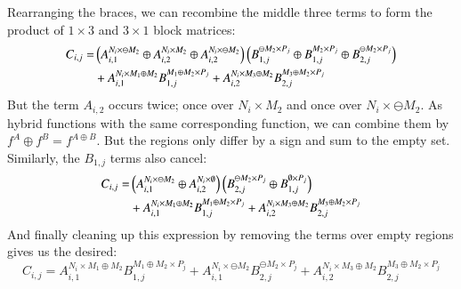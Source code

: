 Rearranging the braces, we can recombine the middle three terms to form the product of $1 \times 3$ and $3 \times 1$ block matrices:
\begin{align*}
	C_{i,j} 	=& \left( A_{i,1}^{N_i \times \ominus M_2} 
				\oplus  A_{i,2}^{N_i \times M_2} 
				\oplus A_{i,2}^{N_i \times \ominus M_2} \right)
			\left( B_{1,j}^{\ominus M_2 \times P_j} 
				\oplus B_{1,j}^{M_2 \times P_j} 
				\oplus B_{2,j}^{\ominus M_2 \times P_j} \right)\notag\\
			&+ A_{i,1}^{N_i \times M_1 \oplus M_2} B_{1,j}^{M_1 \oplus M_2 \times P_j} 
			+ A_{i,2}^{N_i \times M_3 \oplus M_2} B_{2,j}^{M_3 \oplus M_2 \times P_j} 
\end{align*}
But the term $A_{i,2}$ occurs twice; once over $N_i \times M_2$ and once over $N_i \times \ominus M_2$.
As hybrid functions with the same corresponding function, we can combine them by $f^A \oplus f^B = f^{A\oplus B}$.
But the regions only differ by a sign and sum to the empty set.
Similarly, the $B_{1,j}$ terms also cancel:
\begin{align*}
	C_{i,j} 	=& \left( A_{i,1}^{N_i \times \ominus M_2} \oplus  A_{i,2}^{N_i \times \emptyset}  \right)
			\left(  B_{2,j}^{\ominus M_2 \times P_j} \oplus B_{1,j}^{\emptyset \times P_j} \right)\notag\\
			&+ A_{i,1}^{N_i \times M_1 \oplus M_2} B_{1,j}^{M_1 \oplus M_2 \times P_j} 
			+ A_{i,2}^{N_i \times M_3 \oplus M_2} B_{2,j}^{M_3 \oplus M_2 \times P_j} 
\end{align*}
And finally cleaning up this expression by removing the terms over empty regions gives us the desired:
\begin{equation}
	C_{i,j} =  A_{i,1}^{N_i \times M_1 \oplus M_2} B_{1,j}^{M_1 \oplus M_2 \times P_j} 
			+ A_{i,1}^{N_i \times \ominus M_2} B_{2,j}^{\ominus M_2 \times P_j}
			+ A_{i,2}^{N_i \times M_3 \oplus M_2} B_{2,j}^{M_3 \oplus M_2 \times P_j}
\end{equation}



